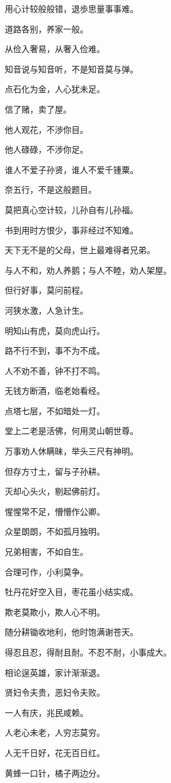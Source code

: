 \documentclass[12pt,oneside]{book}
\begin{document}
用心计较般般错，退歩思量事事难。

道路各别，养家一般。

从俭入奢易，从奢入俭难。

知音说与知音听，不是知音莫与弹。

点石化为金，人心犹未足。

信了赌，卖了屋。

他人观花，不渉你目。

他人碌碌，不渉你足。

谁人不爱子孙贤，谁人不爱千锺粟。

奈五行，不是这般题目。

莫把真心空计较，儿孙自有儿孙福。

书到用时方恨少，事非经过不知难。

天下无不是的父母，世上最难得者兄弟。

与人不和，劝人养鹅；与人不睦，劝人架屋。

但行好事，莫问前程。

河狭水激，人急计生。

明知山有虎，莫向虎山行。

路不行不到，事不为不成。

人不劝不善，钟不打不鸣。

无钱方断酒，临老始看经。

点塔七层，不如暗处一灯。

堂上二老是活佛，何用灵山朝世尊。

万事劝人休瞒昧，举头三尺有神明。

但存方寸土，留与子孙耕。

灭却心头火，剔起佛前灯。

惺惺常不足，懵懵作公卿。

众星朗朗，不如孤月独明。

兄弟相害，不如自生。

合理可作，小利莫争。

牡丹花好空入目，枣花虽小结实成。

欺老莫欺小，欺人心不明。

随分耕锄收地利，他时饱满谢苍天。

得忍且忍，得耐且耐。不忍不耐，小事成大。

相论逞英雄，家计渐渐退。

贤妇令夫贵，恶妇令夫败。

一人有庆，兆民咸赖。

人老心未老，人穷志莫穷。

人无千日好，花无百日红。

黄蜂一口针，橘子两边分。
\end{document}
